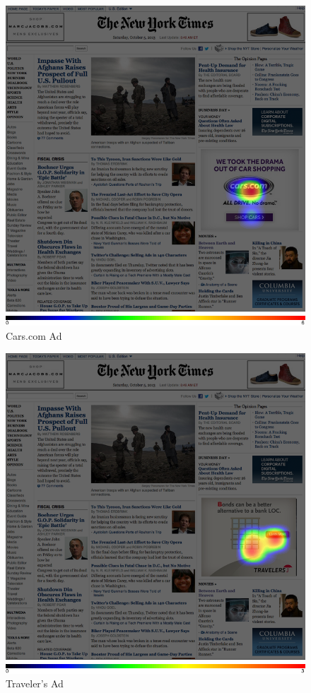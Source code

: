 \begin{figure}
\centerline{
\includegraphics[scale=.3]{chapter6.tex/cars-hotspot}
}
\caption{Cars.com Ad}
\label{prepilot-cars}
\end{figure}

\begin{figure}
\centerline{
\includegraphics[scale=.3]{chapter6.tex/travelers-hotspot}
}
\caption{Traveler's Ad}
\label{prepilot-travelers}
\end{figure}

